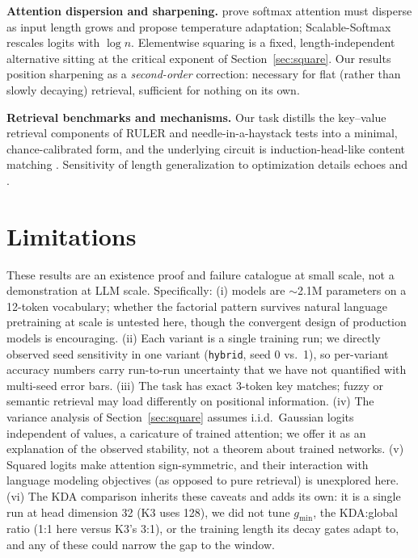\documentclass[10pt]{article}
\begin{document}
\textbf{Attention dispersion and sharpening.}
\citet{velickovic2024softmax} prove softmax attention must disperse as
input length grows and propose temperature adaptation;
Scalable-Softmax \citep{nakanishi2025scalable} rescales logits with
$\log n$. Elementwise squaring is a fixed, length-independent
alternative sitting at the critical exponent of
Section~\ref{sec:square}. Our results position sharpening as a
\emph{second-order} correction: necessary for flat (rather than slowly
decaying) retrieval, sufficient for nothing on its own.

\textbf{Retrieval benchmarks and mechanisms.} Our task distills the
key--value retrieval components of RULER \citep{hsieh2024ruler} and
needle-in-a-haystack tests \citep{kamradt2023needle} into a minimal,
chance-calibrated form, and the underlying circuit is induction-head-like
content matching \citep{olsson2022context}. Sensitivity of length
generalization to optimization details echoes
\citet{zhou2024transformers} and \citet{anil2022exploring}.

\section{Limitations}
\label{sec:limitations}

These results are an existence proof and failure catalogue at small
scale, not a demonstration at LLM scale. Specifically: (i) models are
$\sim$2.1M parameters on a 12-token vocabulary; whether the factorial
pattern survives natural language pretraining at scale is untested here,
though the convergent design of production models
\citep{gemmateam2024gemma2,meta2025llama4} is encouraging. (ii) Each
variant is a single training run; we directly observed seed sensitivity
in one variant (\texttt{hybrid}, seed 0 vs.\ 1), so per-variant accuracy
numbers carry run-to-run uncertainty that we have not quantified with
multi-seed error bars. (iii) The task has exact 3-token key matches;
fuzzy or semantic retrieval may load differently on positional
information. (iv) The variance analysis of Section~\ref{sec:square}
assumes i.i.d.\ Gaussian logits independent of values, a caricature of trained attention; we offer it as an explanation of the observed
stability, not a theorem about trained networks. (v) Squared logits make
attention sign-symmetric, and their interaction with language modeling
objectives (as opposed to pure retrieval) is unexplored here. (vi) The
KDA comparison inherits these caveats and adds its own: it is a single
run at head dimension 32 (K3 uses 128), we did not tune $g_{\min}$, the
KDA:global ratio (1:1 here versus K3's 3:1), or the training length its
decay gates adapt to, and any of these could narrow the gap to the
window.
\end{document}
